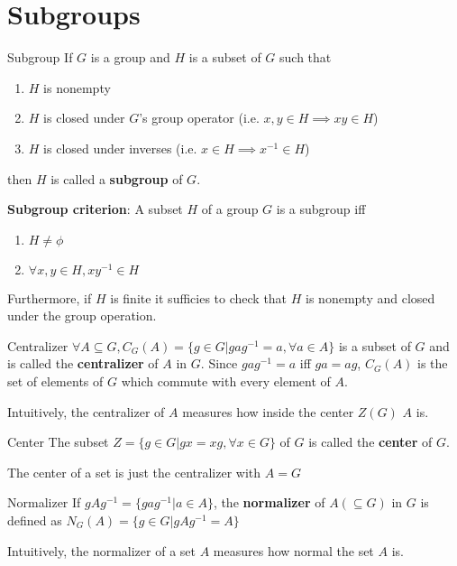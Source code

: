 \documentclass[titlepage, 12pt]{book}
\begin{document}
\chapter{Subgroups}
\begin{definition}{Subgroup}{}
    If $G$ is a group and $H$ is a subset of $G$ such that
    \begin{enumerate}
        \item $H$ is nonempty
        \item $H$ is closed under $G$'s group operator (i.e. $x, y\in H\implies
            xy\in H$)
        \item $H$ is closed under inverses (i.e. $x\in H \implies x^{-1} \in H$)
    \end{enumerate}
    then $H$ is called a \textbf{subgroup} of $G$.
\end{definition}

\textbf{Subgroup criterion}: A subset $H$ of a group $G$ is a subgroup iff
\begin{enumerate}
    \item $H\neq\phi$
    \item $\forall x, y\in H, xy^{-1}\in H$
\end{enumerate}
Furthermore, if $H$ is finite it sufficies to check that $H$ is nonempty and
closed under the group operation.

\begin{definition}{Centralizer}{}
    $\forall A\subseteq G, C_G(A) = \{g\in G| gag^{-1} = a,\forall a\in A\}$ is
    a subset of $G$ and is called the \textbf{centralizer} of $A$ in $G$. Since
    $gag^{-1} = a$ iff $ga = ag$, $C_G(A)$ is the set of elements of $G$ which
    commute with every element of $A$.
\end{definition}
Intuitively, the centralizer of $A$ measures how inside the center $Z(G)$ $A$
is.

\begin{definition}{Center}{}
    The subset $Z = \{g\in G| gx = xg,\forall x\in G\}$ of $G$ is called the
    \textbf{center} of $G$.
\end{definition}
The center of a set is just the centralizer with $A = G$

\begin{definition}{Normalizer}{}
    If $gAg^{-1} = \{gag^{-1}| a\in A\}$, the \textbf{normalizer}  of $A
    (\subseteq G)$ in $G$ is defined as $N_G(A) = \{g\in G| gAg^{-1} = A \}$
\end{definition}
Intuitively, the normalizer of a set $A$ measures how normal the set $A$ is.
\end{document}
